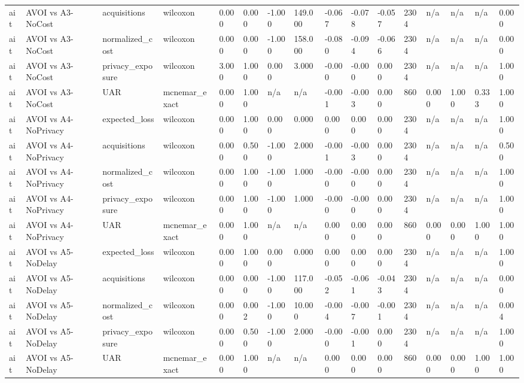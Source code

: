 \begin{table}[!ht]
{\begin{tabular}{llllllllllllllll}
ait & AVOI vs A3-NoCost & acquisitions & wilcoxon & 0.000 & 0.000 & -1.000 & 149.000 & -0.067 & -0.078 & -0.057 & 2304 & n/a & n/a & n/a & 0.000 \\
ait & AVOI vs A3-NoCost & normalized\_cost & wilcoxon & 0.000 & 0.000 & -1.000 & 158.000 & -0.080 & -0.094 & -0.066 & 2304 & n/a & n/a & n/a & 0.000 \\
ait & AVOI vs A3-NoCost & privacy\_exposure & wilcoxon & 3.000 & 1.000 & 0.000 & 3.000 & -0.000 & -0.000 & 0.000 & 2304 & n/a & n/a & n/a & 1.000 \\
ait & AVOI vs A3-NoCost & UAR & mcnemar\_exact & 0.000 & 1.000 & n/a & n/a & -0.001 & -0.003 & 0.000 & 860 & 0.000 & 1.000 & 0.333 & 1.000 \\
ait & AVOI vs A4-NoPrivacy & expected\_loss & wilcoxon & 0.000 & 1.000 & 0.000 & 0.000 & 0.000 & 0.000 & 0.000 & 2304 & n/a & n/a & n/a & 1.000 \\
ait & AVOI vs A4-NoPrivacy & acquisitions & wilcoxon & 0.000 & 0.500 & -1.000 & 2.000 & -0.001 & -0.003 & 0.000 & 2304 & n/a & n/a & n/a & 0.500 \\
ait & AVOI vs A4-NoPrivacy & normalized\_cost & wilcoxon & 0.000 & 1.000 & -1.000 & 1.000 & -0.000 & -0.000 & 0.000 & 2304 & n/a & n/a & n/a & 1.000 \\
ait & AVOI vs A4-NoPrivacy & privacy\_exposure & wilcoxon & 0.000 & 1.000 & -1.000 & 1.000 & -0.000 & -0.000 & 0.000 & 2304 & n/a & n/a & n/a & 1.000 \\
ait & AVOI vs A4-NoPrivacy & UAR & mcnemar\_exact & 0.000 & 1.000 & n/a & n/a & 0.000 & 0.000 & 0.000 & 860 & 0.000 & 0.000 & 1.000 & 1.000 \\
ait & AVOI vs A5-NoDelay & expected\_loss & wilcoxon & 0.000 & 1.000 & 0.000 & 0.000 & 0.000 & 0.000 & 0.000 & 2304 & n/a & n/a & n/a & 1.000 \\
ait & AVOI vs A5-NoDelay & acquisitions & wilcoxon & 0.000 & 0.000 & -1.000 & 117.000 & -0.052 & -0.061 & -0.043 & 2304 & n/a & n/a & n/a & 0.000 \\
ait & AVOI vs A5-NoDelay & normalized\_cost & wilcoxon & 0.000 & 0.002 & -1.000 & 10.000 & -0.004 & -0.007 & -0.001 & 2304 & n/a & n/a & n/a & 0.004 \\
ait & AVOI vs A5-NoDelay & privacy\_exposure & wilcoxon & 0.000 & 0.500 & -1.000 & 2.000 & -0.000 & -0.001 & 0.000 & 2304 & n/a & n/a & n/a & 1.000 \\
ait & AVOI vs A5-NoDelay & UAR & mcnemar\_exact & 0.000 & 1.000 & n/a & n/a & 0.000 & 0.000 & 0.000 & 860 & 0.000 & 0.000 & 1.000 & 1.000 \\

\end{tabular}}
\end{table}
